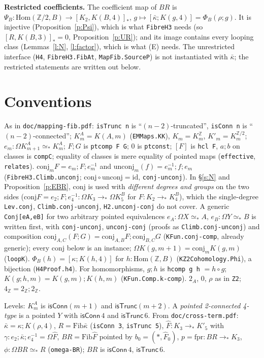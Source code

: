 \documentclass[11pt]{amsart}
\theoremstyle{definition}
\theoremstyle{remark}
\newcommand{\Om}{\Omega}
\newcommand{\Z}{\mathbb{Z}}
\newcommand{\code}[1]{\texttt{#1}}
\newcommand{\cT}{\mathsf{isTrunc}}
\newcommand{\cC}{\mathsf{isConn}}
\newcommand{\lp}{\Omega}
\newcommand{\Hom}{\mathrm{Hom}}
\newcommand{\hc}[2]{[#1,#2]_*}
\newcommand{\Fib}{\mathrm{Fib}}
\newcommand{\cls}[1]{[#1]}
\newcommand{\kb}{\bar\kappa}
\newcommand{\Fh}{\hat F}
\newcommand{\cj}{\mathrm{conj}}
\newcommand{\ucj}{\mathrm{unconj}}
\begin{document}
\smallskip\noindent\textbf{Restricted coefficients.} The coefficient map of
$BR$ is $\Psi_B:\Hom(\Z/2,B)\to\hc{K_2}{K(B,4)}$,
$g\mapsto\cls{\kb;K(g,4)}=\Phi_B(\rho;g)$. It is injective
(Proposition~\ref{p:Psi}), which is what \code{FibreH3} needs (so
$\hc R{K(B,3)}=0$, Proposition~\ref{p:UR}); and its image contains every
looping class (Lemmas~\ref{l:N}, \ref{l:factor}), which is what (E) needs.
The unrestricted interface (\code{H4}, \code{FibreH3.FibAt},
\code{MapFib.SourceP}) is not instantiated with $\kb$; the restricted
statements are written out below.

\section{Conventions}

As in \code{doc/mapping-fib.pdf}: \code{isTrunc n} is ``$(n-2)$-truncated'',
\code{isConn n} is ``$(n-2)$-connected''; $K^A_m=K(A,m)$ (\code{EMMaps.KK}),
$K_m=K^\Z_m$, $K'_m=K^{\Z/2}_m$; $e_m:\Om K^A_{m+1}\simeq_*K^A_m$; $F;G$ is
\code{ptcomp F G}; $0$ is \code{ptconst}; $\cls F$ is \code{hcl F}, $a;b$ on
classes is \code{compC}; equality of classes is mere equality of pointed maps
(\code{effective}, \code{relates}). $\cj_mF=e_m;F;e_m^{-1}$ and
$\ucj_m(f)=e_m^{-1};f;e_m$ (\code{FibreH3.Climb.unconj}; $\cj\circ\ucj=\mathrm{id}$,
\code{conj-unconj}). In \S\ref{s:N} and Proposition~\ref{p:EBR}, $\cj$ is used with
\emph{different degrees and groups} on the two sides ($\cj F=e_2;F;e_4^{-1}:\Om K_3\to_*\Om K^B_5$
for $F:K_2\to_*K^B_4$), which the single-degree \code{Lev.conj}, \code{Climb.conj-unconj},
\code{H2.unconj-conj} do not cover. A generic \code{Conj[eA,eB]} for two arbitrary pointed
equivalences $e_A:\Om X\simeq_*A$, $e_B:\Om Y\simeq_*B$ is written first, with
\code{conj-unconj}, \code{unconj-conj} (proofs as \code{Climb.conj-unconj}) and composition
$\cj_{A,C}(F;G)=\cj_{A,B}F;\cj_{B,C}G$ (\code{KFun.conj-comp}, already generic); every
$\cj$ below is an instance;
$\lp K(g,m{+}1)=\cj_mK(g,m)$ (\code{loopK}). $\Phi_B(h)=\cls{\kappa;K(h,4)}$
for $h:\Hom(\Z,B)$ (\code{KZ2Cohomology.Phi}), a bijection (\code{H4Proof.h4}).
For homomorphisms, $g;h$ is \code{hcomp g h} $=h\circ g$; $K(g;h,m)=K(g,m);K(h,m)$
(\code{KFun.Comp.k-comp}). $2_A$, $0$, $\rho$ as in \code{Z2}; $4_\Z=2_\Z;2_\Z$.

Levels: $K^A_m$ is $\cC(m{+}1)$ and $\cT(m{+}2)$. A \emph{pointed 2-connected
4-type} is a pointed $Y$ with $\cC\,4$ and $\cT\,6$. From
\code{doc/cross-term.pdf}: $\kb=\kappa;K(\rho,4)$, $R=\Fib\kb$ (\code{isConn 3},
\code{isTrunc 5}), $\Fh:K_3\to_*K'_5$ with $\gamma:e_2;\kb;e_4^{-1}=\lp\Fh$,
$BR=\Fib\Fh$ pointed by $b_0=(*,\Fh_0)$, $p=\mathrm{fpr}:BR\to_*K_3$,
$\phi:\Om BR\simeq_*R$ (\code{omega-BR}); $BR$ is $\cC\,4$, $\cT\,6$.
\end{document}
